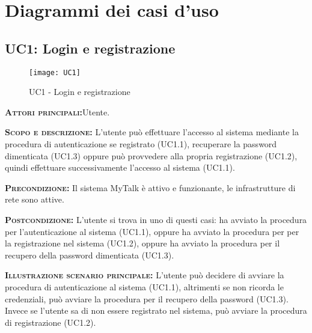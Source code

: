 \newpage
\section{Diagrammi dei casi d'uso}

\subsection{UC1: Login e registrazione}
\begin{figure}[H]
\begin{center}
\texttt{[image: UC1]}
\caption{UC1 - Login e registrazione}\label{fig:login_e_registrazione}
\end{center}
\end{figure}
\begin{description}
\item{\scshape\bfseries Attori principali:}Utente.
\item{\scshape\bfseries Scopo e descrizione:} L'utente può effettuare l'accesso al sistema mediante la procedura di autenticazione se registrato (UC1.1), recuperare la password dimenticata (UC1.3) oppure può provvedere alla propria registrazione (UC1.2), quindi effettuare successivamente l'accesso al sistema (UC1.1).
\item{\scshape\bfseries Precondizione:} Il sistema MyTalk è attivo e funzionante, le infrastrutture di rete sono attive.
\item{\scshape\bfseries Postcondizione:} L'utente si trova in uno di questi casi: ha avviato la procedura per l'autenticazione al sistema (UC1.1), oppure ha avviato la procedura per per la registrazione nel sistema (UC1.2), oppure ha avviato la procedura per il recupero della password dimenticata (UC1.3).
\item{\scshape\bfseries Illustrazione scenario principale:} L'utente può decidere di avviare la procedura di autenticazione al sistema (UC1.1), altrimenti se non ricorda le credenziali, può avviare la procedura per il recupero della password (UC1.3). Invece se l'utente sa di non essere registrato nel sistema, può avviare la procedura di registrazione (UC1.2).
\end{description}

